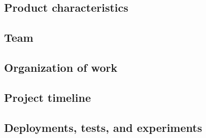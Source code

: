 \subsection{Product characteristics}

\subsection{Team}

\subsection{Organization of work}

\subsection{Project timeline}

\subsection{Deployments, tests, and experiments}
